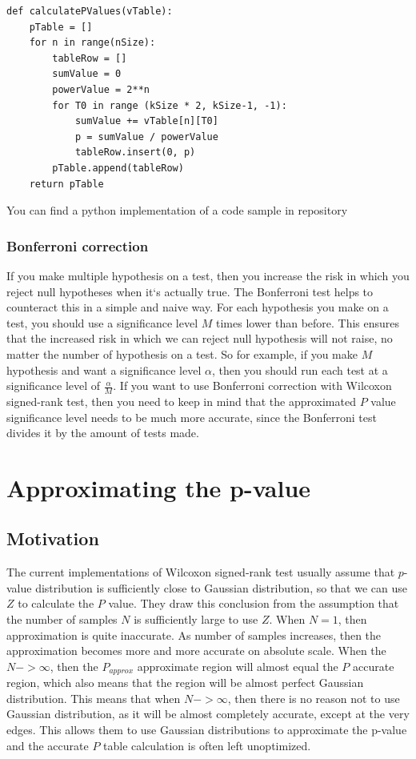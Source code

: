 \documentclass[12pt]{article}
\begin{document}
{\begin{lstlisting}
def calculatePValues(vTable):
    pTable = []
    for n in range(nSize):
        tableRow = []
        sumValue = 0
        powerValue = 2**n
        for T0 in range (kSize * 2, kSize-1, -1):
            sumValue += vTable[n][T0]
            p = sumValue / powerValue
            tableRow.insert(0, p)
        pTable.append(tableRow)
    return pTable

\end{lstlisting}

You can find a python implementation of a code sample in repository ~\cite{stenver_repo_p_accurate_table_py}

\subsubsection{Bonferroni correction}

If you make multiple hypothesis on a test, then you increase the risk in which you reject null hypotheses when it`s actually true. The Bonferroni test helps to counteract this in a simple and naive way. For each hypothesis you make on a test, you should use a significance level $M$ times lower than before. This ensures that the increased risk in which we can reject null hypothesis will not raise, no matter the number of hypothesis on a test. So for example, if you make $M$ hypothesis and want a significance level $\alpha$,  then you should run each test at a significance level of $\frac{\alpha}{M}$. If you want to use Bonferroni correction with Wilcoxon signed-rank test, then you need to keep in mind that the approximated $P$ value significance level needs to be much more accurate, since the Bonferroni test divides it by the amount of tests made.

\newpage

\section{Approximating the p-value}
\label{sec:approximating_p_value}

\subsection{Motivation}

The current implementations of Wilcoxon signed-rank test usually assume that $p$-value distribution is sufficiently close to Gaussian distribution, so that we can use $Z$ to calculate the $P$ value. They draw this conclusion from the assumption that the number of samples $N$ is sufficiently large to use $Z$. When $N = 1$, then approximation is quite inaccurate. As number of samples increases, then the approximation becomes more and more accurate on absolute scale. When the $N->\infty$, then the $P_{approx}$ approximate region will almost equal the $P$ accurate region, which also means that the region will be almost perfect Gaussian distribution. This means that when $N->\infty$, then there is no reason not to use Gaussian distribution, as it will be almost completely accurate, except at the very edges. This allows them to use Gaussian distributions to approximate the p-value and the accurate $P$ table calculation is often left unoptimized.

}
\end{document}
